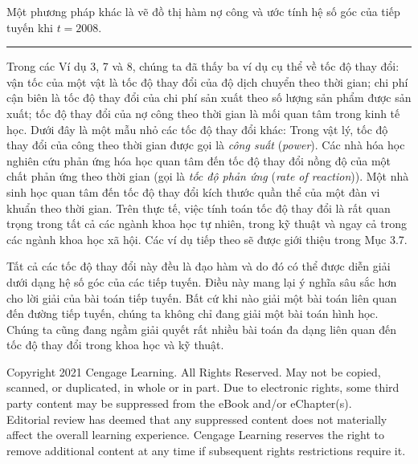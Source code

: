 \begin{minipage}[t]{126mm}
  Một phương pháp khác là vẽ đồ thị hàm nợ công và ước tính hệ số góc của tiếp tuyến khi $t = 2008$.\hfill{\color{stewartblue}\rule{1.1ex}{1.1ex}}\par

  \vspace{4.5mm}
  Trong các Ví dụ 3, 7 và 8, chúng ta đã thấy ba ví dụ cụ thể về tốc độ thay đổi: vận tốc của một vật là tốc độ thay đổi của độ dịch chuyển theo thời gian; chi phí cận biên là tốc độ thay đổi của chi phí sản xuất theo số lượng sản phẩm được sản xuất; tốc độ thay đổi của nợ công theo thời gian là mối quan tâm trong kinh tế học. Dưới đây là một mẫu nhỏ các tốc độ thay đổi khác: Trong vật lý, tốc độ thay đổi của công theo thời gian được gọi là \textit{công suất} (\textit{power}). Các nhà hóa học nghiên cứu phản ứng hóa học quan tâm đến tốc độ thay đổi nồng độ của một chất phản ứng theo thời gian (gọi là \textit{tốc độ phản ứng} (\textit{rate of reaction})). Một nhà sinh học quan tâm đến tốc độ thay đổi kích thước quần thể của một đàn vi khuẩn theo thời gian. Trên thực tế, việc tính toán tốc độ thay đổi là rất quan trọng trong tất cả các ngành khoa học tự nhiên, trong kỹ thuật và ngay cả trong các ngành khoa học xã hội. Các ví dụ tiếp theo sẽ được giới thiệu trong Mục 3.7.\par

  \vspace{3.5mm}
  Tất cả các tốc độ thay đổi này đều là đạo hàm và do đó có thể được diễn giải dưới dạng hệ số góc của các tiếp tuyến. Điều này mang lại ý nghĩa sâu sắc hơn cho lời giải của bài toán tiếp tuyến. Bất cứ khi nào giải một bài toán liên quan đến đường tiếp tuyến, chúng ta không chỉ đang giải một bài toán hình học. Chúng ta cũng đang ngầm giải quyết rất nhiều bài toán đa dạng liên quan đến tốc độ thay đổi trong khoa học và kỹ thuật.\par
\end{minipage}

\vfill
\begin{center}
  {\fontsize{6.5pt}{8pt}\selectfont \color{gray!80!black}
  Copyright 2021 Cengage Learning. All Rights Reserved. May not be copied, scanned, or duplicated, in whole or in part. Due to electronic rights, some third party content may be suppressed from the eBook and/or eChapter(s).\\
  Editorial review has deemed that any suppressed content does not materially affect the overall learning experience. Cengage Learning reserves the right to remove additional content at any time if subsequent rights restrictions require it.\par}
\end{center}
